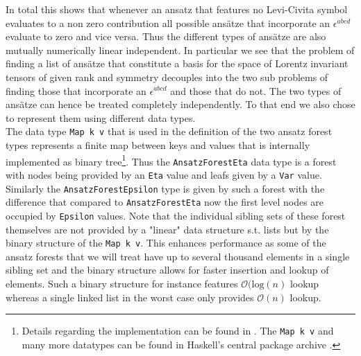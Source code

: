 \documentclass[a4paper,12pt, DIV=14, BCOR=5mm, twoside, headsepline, numbers=noenddot]{scrbook}
\begin{document}
In total this shows that whenever an ansatz that features no Levi-Civita symbol evaluates to a non zero contribution all possible ansätze that incorporate an $\epsilon^{abcd}$ evaluate to zero and vice versa. Thus the different types of ansätze are also mutually numerically linear independent. In particular we see that the problem of finding a list of ansätze that constitute a basis for the space of Lorentz invariant tensors of given rank and symmetry decouples into the two sub problems of finding those that incorporate an $\epsilon^{abcd}$ and those that do not. The two types of ansätze can hence be treated completely independently. To that end we also chose to represent them using different data types. \\

The data type \texttt{Map k v} that is used in the  definition of the two ansatz forest types represents a finite map between keys and values that is internally implemented as binary tree\footnote{Details regarding the implementation can be found in \cite{adams_1993}. The \texttt{Map k v} \cite{HackageMap} and many more datatypes can be found in Haskell's central package archive \cite{Hackage}.}. Thus the \texttt{AnsatzForestEta} data type is a forest with nodes being provided by an \texttt{Eta} value and leafs given by a \texttt{Var} value. Similarly the \texttt{AnsatzForestEpsilon} type is given by such a forest with the difference that compared to \texttt{AnsatzForestEta} now the first level nodes are occupied by \texttt{Epsilon} values. Note that the individual sibling sets of these forest themselves are not provided by a "linear" data structure s.t. lists but by the binary structure of the \texttt{Map k v}. This enhances performance as some of the ansatz forests that we will treat have up to several thousand elements in a single sibling set and the binary structure allows for faster insertion and lookup of elements. Such a binary structure for instance features $\mathcal{O}(\mathrm{log}(n)$ lookup whereas a single linked list in the worst case only provides $\mathcal{O}(n)$ lookup. \\
\end{document}
